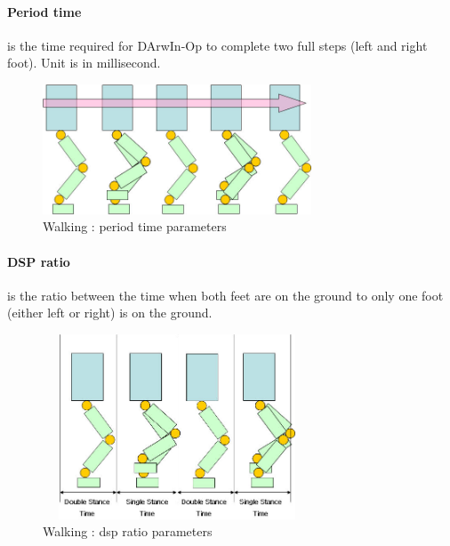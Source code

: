 \documentclass[a4paper, 12pt]{article}  		%
\begin{document}
\newpage
\paragraph*{Period time}
is the time required for DArwIn-Op to complete two full steps (left and right foot). Unit is in millisecond.
\begin{figure}[H]
\begin{center}
\includegraphics[width=8cm]{period_time.jpg}
\caption{Walking : period time parameters}
\label{period_time}
\end{center}
\end{figure}

\paragraph*{DSP ratio}
is the ratio between the time when both feet are on the ground to only one foot (either left or right) is on the ground.
\begin{figure}[H]
\begin{center}
\includegraphics[width=8cm, height=5.5cm]{dsp_ratio.jpg}
\caption{Walking : dsp ratio parameters}
\label{dsp_ratio}
\end{center}
\end{figure}

\newpage
\end{document}
